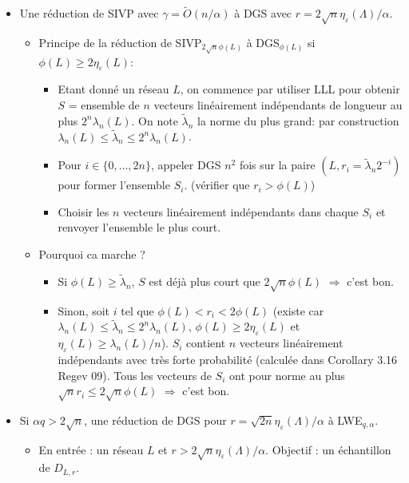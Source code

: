\medskip


\begin{itemize}
\item Une réduction de SIVP avec $\gamma=\tilde{O}(n / \alpha)$ à DGS avec $r=2 \sqrt{n} \eta_{\varepsilon}(\Lambda) / \alpha$.
\begin{itemize}
\item Principe de la réduction de SIVP$_{2\sqrt{n} \phi(L)}$ à DGS$_{\phi(L)}$ si $\phi(L) \geq 2  \eta_{\varepsilon}(L)$:
\begin{itemize}
\item Etant donné un réseau $L$, on commence par utiliser LLL pour obtenir $S$ = ensemble de $n$ vecteurs linéairement indépendants de longueur au plus $2^n \lambda_n(L)$. On note $\tilde{\lambda}_n$ la norme du plus grand: par construction $\lambda_n(L) \leq \tilde{\lambda}_n \leq 2^n \lambda_n(L) $.
\item Pour $i \in \{0, \ldots, 2n \}$, appeler DGS $n^2$ fois sur la paire $(L,r_i = \tilde{\lambda}_n 2^{-i})$ pour former l'ensemble $S_i$. (vérifier que $r_i > \phi(L)$)
\item Choisir les $n$ vecteurs linéairement indépendants dans chaque $S_i$ et renvoyer l'ensemble le plus court.
\end{itemize}
\item Pourquoi ca marche ?
\begin{itemize}
\item Si $\phi(L) \geq \tilde{\lambda}_n $, $S$ est déjà plus court que $2 \sqrt{n} \phi(L)$ $\Rightarrow$ c'est bon.
\item Sinon, soit $i$ tel que $\phi(L) < r_i < 2 \phi (L)$ (existe car $\lambda_n(L) \leq \tilde{\lambda}_n \leq 2^n \lambda_n(L) $, $\phi(L) \geq 2  \eta_{\varepsilon}(L)$ et $\eta_{\varepsilon}(L) \geq \lambda_n(L)/n$). $S_i$ contient $n$ vecteurs linéairement indépendants avec très forte probabilité (calculée dans Corollary 3.16 Regev 09). Tous les vecteurs de $S_i$ ont pour norme au plus $\sqrt{n} r_i \leq 2 \sqrt{n} \phi (L)$ $\Rightarrow$ c'est bon.
\end{itemize}
\end{itemize}
\item Si $\alpha q > 2 \sqrt{n}$, une réduction de DGS pour $r= \sqrt{2n} \eta_{\varepsilon}(\Lambda) / \alpha$ à LWE$_{q,\alpha}$.
\begin{itemize}
\item En entrée : un réseau $L$ et $r > 2 \sqrt{n} \eta_{\varepsilon}(\Lambda) / \alpha$. Objectif : un échantillon de $D_{L,r}$.

\end{itemize}
\end{itemize}
